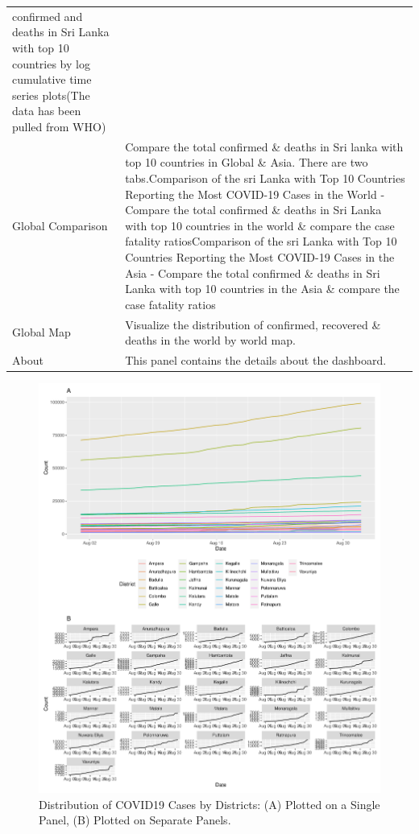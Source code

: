 \documentclass[
]{article}
\begin{document}
\begin{longtable}[]{@{}
  >{\raggedright\arraybackslash}p{}
  >{\raggedright\arraybackslash}p{}@{}}
confirmed and deaths in Sri Lanka with top 10 countries by log
cumulative time series plots\hfill\break (The data has been pulled from
WHO)\hfill\break \\
Global Comparison & Compare the total confirmed \& deaths in Sri lanka
with top 10 countries in Global \& Asia. There are two
tabs.\hfill\break * Comparison of the sri Lanka with Top 10 Countries
Reporting the Most COVID-19 Cases in the World - Compare the total
confirmed \& deaths in Sri Lanka with top 10 countries in the world \&
compare the case fatality ratios\hfill\break * Comparison of the sri
Lanka with Top 10 Countries Reporting the Most COVID-19 Cases in the
Asia - Compare the total confirmed \& deaths in Sri Lanka with top 10
countries in the Asia \& compare the case fatality ratios\hfill\break \\
Global Map & Visualize the distribution of confirmed, recovered \&
deaths in the world by world map.\hfill\break \\
About & This panel contains the details about the dashboard. \\
\bottomrule
\end{longtable}

\begin{figure}
\centering
\includegraphics{manuscript_covid19dashboard_files/figure-latex/unnamed-chunk-3-1.pdf}
\caption{Distribution of COVID19 Cases by Districts: (A) Plotted on a
Single Panel, (B) Plotted on Separate Panels.}
\end{figure}
\end{document}
